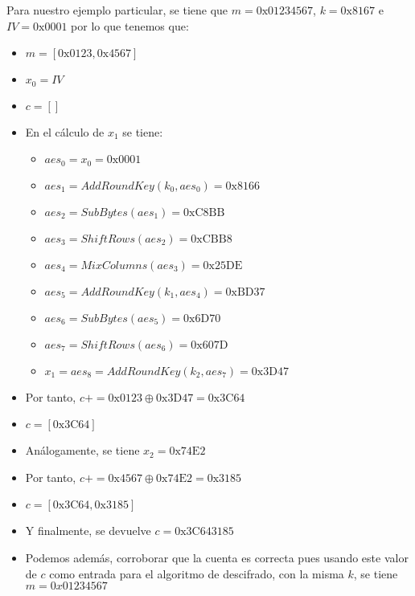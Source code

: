 \begin{enumerate}
		Para nuestro ejemplo particular, se tiene que $m = \mathrm{0x01234567}$, $k = \mathrm{0x8167}$ e
		$IV = \mathrm{0x0001}$ por lo que tenemos que:
		\begin{itemize}
			\item $m = [\mathrm{0x0123}, \mathrm{0x4567}]$
			\item $x_0 = IV$
			\item $c = []$
			\item En el cálculo de $x_1$ se tiene:
			\begin{itemize}
				\item $aes_0 = x_0 = \mathrm{0x0001}$
				\item $aes_1 = AddRoundKey(k_0, aes_0) = \mathrm{0x8166}$
				\item $aes_2 = SubBytes(aes_1) = \mathrm{0xC8BB}$
				\item $aes_3 = ShiftRows(aes_2) = \mathrm{0xCBB8}$
				\item $aes_4 = MixColumns(aes_3) = \mathrm{0x25DE}$
				\item $aes_5 = AddRoundKey(k_1, aes_4) = \mathrm{0xBD37}$
				\item $aes_6 = SubBytes(aes_5) = \mathrm{0x6D70}$
				\item $aes_7 = ShiftRows(aes_6) = \mathrm{0x607D}$
				\item $x_1 = aes_8 = AddRoundKey(k_2, aes_7) = \mathrm{0x3D47}$
			\end{itemize}
			\item Por tanto, $c += \mathrm{0x0123} \oplus \mathrm{0x3D47} = \mathrm{0x3C64}$
			\item $c = [\mathrm{0x3C64}]$
			\item Análogamente, se tiene $x_2 = \mathrm{0x74E2}$
			\item Por tanto, $c += \mathrm{0x4567} \oplus \mathrm{0x74E2} = \mathrm{0x3185}$
			\item $c = [\mathrm{0x3C64}, \mathrm{0x3185}]$
			\item Y finalmente, se devuelve $c = \mathrm{0x3C643185}$
			\item Podemos además, corroborar que la cuenta es correcta pues usando este valor de $c$ como
			entrada para el algoritmo de descifrado, con la misma $k$, se tiene $m = 0x01234567$
		\end{itemize}
		

\end{enumerate}
